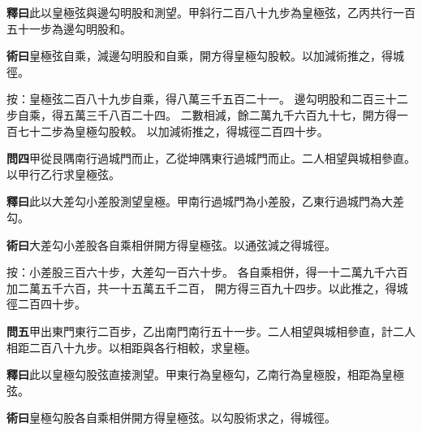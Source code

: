 \documentclass[12pt,a4paper]{article}
\begin{document}
\vspace{0.3em}

\noindent\textbf{釋曰}\quad 此以皇極弦與邊勾明股和測望。甲斜行二百八十九步為皇極弦，乙丙共行一百五十一步為邊勾明股和。

\vspace{0.3em}

\noindent\textbf{術曰}\quad 皇極弦自乘，減邊勾明股和自乘，開方得皇極勾股較。以加減術推之，得城徑。

\vspace{0.3em}

\noindent
按：皇極弦二百八十九步自乘，得八萬三千五百二十一。
邊勾明股和二百三十二步自乘，得五萬三千八百二十四。
二數相減，餘二萬九千六百九十七，開方得一百七十二步為皇極勾股較。
以加減術推之，得城徑二百四十步。

\vspace{0.5em}

\noindent\textbf{問四}\quad 甲從艮隅南行過城門而止，乙從坤隅東行過城門而止。二人相望與城相參直。以甲行乙行求皇極弦。

\vspace{0.3em}

\noindent\textbf{釋曰}\quad 此以大差勾小差股測望皇極。甲南行過城門為小差股，乙東行過城門為大差勾。

\vspace{0.3em}

\noindent\textbf{術曰}\quad 大差勾小差股各自乘相併開方得皇極弦。以通弦減之得城徑。

\vspace{0.3em}

\noindent
按：小差股三百六十步，大差勾一百六十步。
各自乘相併，得一十二萬九千六百加二萬五千六百，共一十五萬五千二百，
開方得三百九十四步。以此推之，得城徑二百四十步。

\vspace{0.5em}

\noindent\textbf{問五}\quad 甲出東門東行二百步，乙出南門南行五十一步。二人相望與城相參直，計二人相距二百八十九步。以相距與各行相較，求皇極。

\vspace{0.3em}

\noindent\textbf{釋曰}\quad 此以皇極勾股弦直接測望。甲東行為皇極勾，乙南行為皇極股，相距為皇極弦。

\vspace{0.3em}

\noindent\textbf{術曰}\quad 皇極勾股各自乘相併開方得皇極弦。以勾股術求之，得城徑。

\vspace{0.3em}
\end{document}
